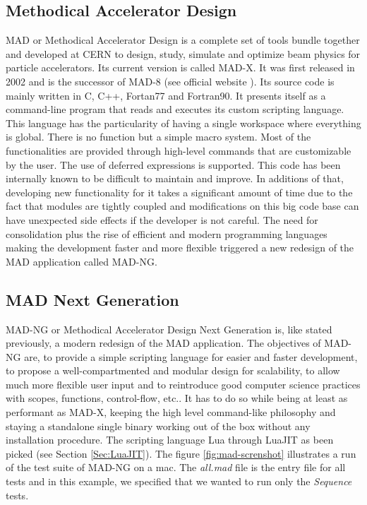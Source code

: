 

\subsection{Methodical Accelerator Design}
\label{Subsec:mad-orig}

MAD or Methodical Accelerator Design is a complete set of tools bundle together
and developed at CERN to design, study, simulate and optimize beam physics for
particle accelerators. Its current version is called MAD-X. It was first released
in 2002 and is the successor of  MAD-8 (see official website \cite{madx}).
Its source code is mainly written in C, C++, Fortan77 and Fortran90.
It presents itself as a command-line program that reads and executes its custom
scripting language. This language has the particularity of having a single
workspace where everything is global. There is no function but a simple macro
system. Most of the functionalities are provided through high-level commands that
are customizable by the user. The use of deferred expressions is supported.
This code has been internally known to
be difficult to maintain and improve. In additions of that, developing new
functionality for it takes a significant amount of time due to the fact that
modules are tightly coupled and modifications on this big code base can have
unexpected side effects if the developer is not careful. The need for
consolidation plus the rise of efficient and modern programming languages making
the development faster and more flexible triggered a new redesign of the MAD
application called MAD-NG.



\subsection{MAD Next Generation}
\label{Subsec:mad-ng}

MAD-NG or Methodical Accelerator Design Next Generation is, like stated previously,
a modern redesign of the MAD application. The objectives of MAD-NG are, to provide
a simple scripting language for easier and faster development, to propose
a well-compartmented and modular design for scalability, to allow much more
flexible user input and to reintroduce good computer science practices with scopes,
functions, control-flow, etc.. It has to do so while being at least as performant
as MAD-X, keeping the high level command-like philosophy and staying a standalone
single binary working out of the box without any installation procedure.
The scripting language Lua through LuaJIT as been picked (see Section \ref{Sec:LuaJIT}).
The figure \ref{fig:mad-screnshot} illustrates a run of the test suite of MAD-NG on
a mac. The \emph{all.mad} file is the entry file for all tests and in this example,
we specified that we wanted to run only the \emph{Sequence} tests.

